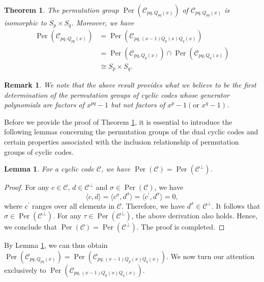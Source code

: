 \documentclass[journal,12pt,onecolumn]{IEEEtran}
\newtheorem{theorem}{Theorem}
\newtheorem{lemma}{Lemma}
\newtheorem{remark}{Remark}
\begin{document}
 
\begin{theorem}\label{L_pq}
    The permutation group $\operatorname{Per}(\mathcal{C}_{pq,Q_{pq}(x)})$ of $\mathcal{C}_{pq,Q_{pq}(x)}$ is isomorphic to $S_p\times S_q$. Moreover, we have
    \begin{align*}
        \operatorname{Per}(\mathcal{C}_{pq,Q_{pq}(x)}) &= \operatorname{Per}(\mathcal{C}_{pq,(x-1)Q_p(x)Q_q(x)}) \\
        &= \operatorname{Per}(\mathcal{C}_{pq,Q_p(x)})\cap \operatorname{Per}(\mathcal{C}_{pq,Q_q(x)}) \\
        &\cong S_p\times S_q. 
    \end{align*}
\end{theorem}
 
\begin{remark}
    We note that the above result provides what we believe to be the first determination of the permutation groups of cyclic codes whose generator polynomials are factors of $x^{pq}-1$ but not factors of $x^p-1(\text{or }x^q-1)$.
\end{remark}
 

Before we provide the proof of Theorem \ref{L_pq}, it is essential to introduce the following lemmas concerning the permutation groups of the dual cyclic codes and certain properties associated with the inclusion relationship of permutation groups of cyclic codes.

 
\begin{lemma}\label{dual_per}
    For a cyclic code $\mathcal{C}$, we have $\operatorname{Per}(\mathcal{C}) = \operatorname{Per}(\mathcal{C}^\perp)$. 
\end{lemma}
\begin{proof}
    For any $c\in\mathcal{C}$, $d\in\mathcal{C}^\perp$ and $\sigma \in \operatorname{Per}(\mathcal{C})$, we have
    \[
        \langle c,d \rangle = \langle c^\sigma,d^\sigma\rangle = \langle c^\prime,d^\sigma\rangle = 0,
    \]
    where $c^\prime$ ranges over all elements in $\mathcal{C}$. Therefore, we have $d^\sigma\in\mathcal{C}^\perp$. It follows that $\sigma\in\operatorname{Per}(\mathcal{C}^\perp)$. For any $\tau \in \operatorname{Per}(\mathcal{C}^\perp)$, the above derivation also holds. Hence, we conclude that $\operatorname{Per}(\mathcal{C}) = \operatorname{Per}(\mathcal{C}^\perp)$. The proof is completed. 
\end{proof}

By Lemma \ref{dual_per}, we can thus obtain $\operatorname{Per}(\mathcal{C}_{pq,Q_{pq}(x)}) = \operatorname{Per}(\mathcal{C}_{pq,(x-1)Q_p(x)Q_q(x)})$. We now turn our attention exclusively to $\operatorname{Per}(\mathcal{C}_{pq,(x-1)Q_p(x)Q_q(x)})$.
\end{document}
